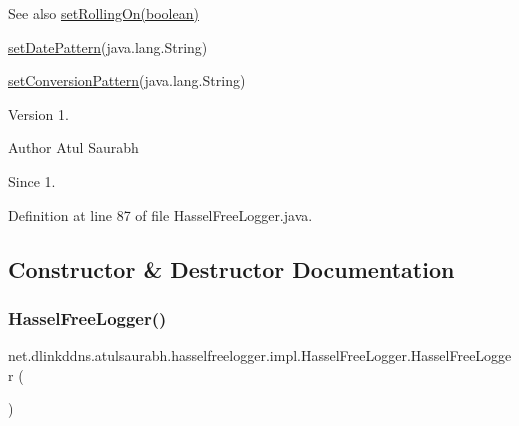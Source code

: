 \begin{DoxySeeAlso}{See also}
\mbox{\hyperlink{classnet_1_1dlinkddns_1_1atulsaurabh_1_1hasselfreelogger_1_1impl_1_1_hassel_free_logger_a9ef8b4f7c9615f50c03f168f1b949f64}{set\+Rolling\+On(boolean)}} 

\mbox{\hyperlink{classnet_1_1dlinkddns_1_1atulsaurabh_1_1hasselfreelogger_1_1impl_1_1_hassel_free_logger_a72529568d69eea543b2238a466cedf8d}{set\+Date\+Pattern}}(java.\+lang.\+String) 

\mbox{\hyperlink{classnet_1_1dlinkddns_1_1atulsaurabh_1_1hasselfreelogger_1_1impl_1_1_hassel_free_logger_a23a1e3b5c56528e197c7eb3832e7c69e}{set\+Conversion\+Pattern}}(java.\+lang.\+String)
\end{DoxySeeAlso}
\begin{DoxyVersion}{Version}
1. 
\end{DoxyVersion}
\begin{DoxyAuthor}{Author}
Atul Saurabh 
\end{DoxyAuthor}
\begin{DoxySince}{Since}
1. 
\end{DoxySince}


Definition at line 87 of file Hassel\+Free\+Logger.\+java.



\subsection{Constructor \& Destructor Documentation}
\mbox{\label{classnet_1_1dlinkddns_1_1atulsaurabh_1_1hasselfreelogger_1_1impl_1_1_hassel_free_logger_a603e83e38bc2c011dd3e5edf074acb1d}} 
\subsubsection{\texorpdfstring{Hassel\+Free\+Logger()}{HasselFreeLogger()}\hspace{0.1cm}{\footnotesize\ttfamily [1/2]}}
{\footnotesize\ttfamily net.\+dlinkddns.\+atulsaurabh.\+hasselfreelogger.\+impl.\+Hassel\+Free\+Logger.\+Hassel\+Free\+Logger (\begin{DoxyParamCaption}{ }\end{DoxyParamCaption})}

